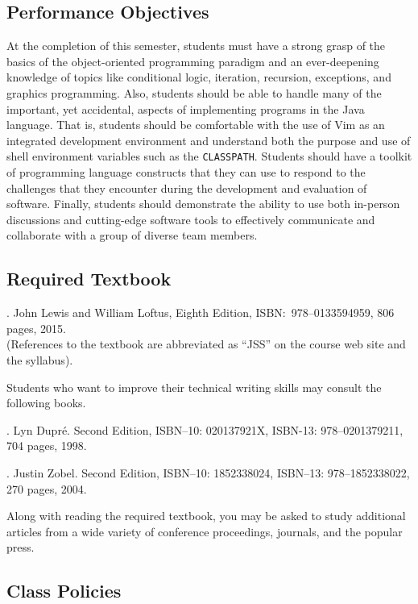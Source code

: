 \subsection*{Performance Objectives}

At the completion of this semester, students must have a strong grasp of the basics of the object-oriented programming
paradigm and an ever-deepening knowledge of topics like conditional logic, iteration, recursion, exceptions, and
graphics programming.  Also, students should be able to handle many of the important, yet accidental, aspects of
implementing programs in the Java language.  That is, students should be comfortable with the use of Vim as an
integrated development environment and understand both the purpose and use of shell environment variables such as the
{\tt CLASSPATH}.  Students should have a toolkit of programming language constructs that they can use to respond to the
challenges that they encounter during the development and evaluation of software. Finally, students should demonstrate
the ability to use both in-person discussions and cutting-edge software tools to effectively communicate and collaborate
with a group of diverse team members.

\subsection*{Required Textbook}

. John Lewis and William Loftus,
Eighth Edition, ISBN:\ 978--0133594959, 806 pages, 2015. \\
(References to the textbook are abbreviated as ``JSS'' on the course web site and the syllabus).

\noindent
Students who want to improve their technical writing skills may consult the following books.

. Lyn Dupr\'e. Second Edition,  ISBN--10: 020137921X,
ISBN-13: 978--0201379211, 704 pages, 1998.

.  Justin Zobel. Second Edition,  ISBN--10: 1852338024, ISBN--13:
978--1852338022, 270 pages, 2004.

\noindent Along with reading the required textbook, you may be asked to study additional articles from a wide variety of
conference proceedings, journals, and the popular press.

\subsection*{Class Policies}

